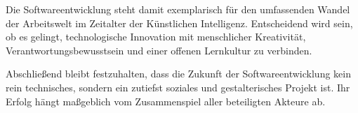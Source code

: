 Die Softwareentwicklung steht damit exemplarisch für den umfassenden Wandel der
Arbeitswelt im Zeitalter der Künstlichen Intelligenz. Entscheidend wird sein,
ob es gelingt, technologische Innovation mit menschlicher Kreativität,
Verantwortungsbewusstsein und einer offenen Lernkultur zu verbinden.

Abschließend bleibt festzuhalten, dass die Zukunft der Softwareentwicklung kein
rein technisches, sondern ein zutiefst soziales und gestalterisches Projekt
ist. Ihr Erfolg hängt maßgeblich vom Zusammenspiel aller beteiligten Akteure
ab.

% 

% 

% 